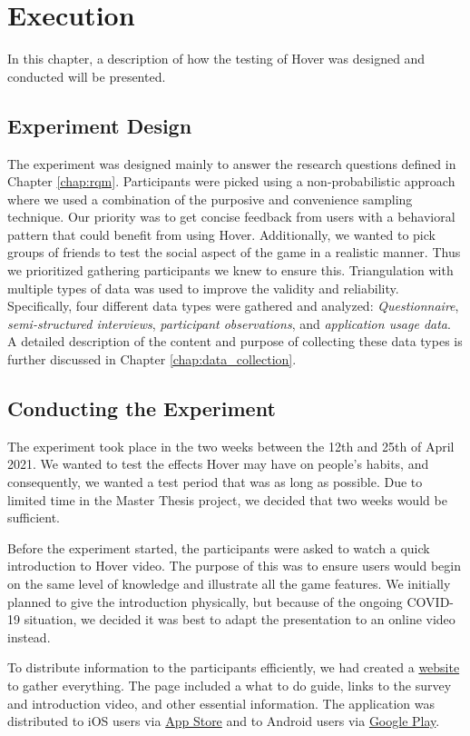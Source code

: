 \section{Execution}
\label{chap:execution}
In this chapter, a description of how the testing of Hover was designed and conducted will be presented.

\subsection{Experiment Design}
The experiment was designed mainly to answer the research questions defined in Chapter \ref{chap:rqm}. Participants were picked using a non-probabilistic approach where we used a combination of the purposive and convenience sampling technique. Our priority was to get concise feedback from users with a behavioral pattern that could benefit from using Hover. Additionally, we wanted to pick groups of friends to test the social aspect of the game in a realistic manner. Thus we prioritized gathering participants we knew to ensure this. Triangulation with multiple types of data was used to improve the validity and reliability. Specifically, four different data types were gathered and analyzed: \textit{Questionnaire}, \textit{semi-structured interviews}, \textit{participant observations}, and \textit{application usage data}. A detailed description of the content and purpose of collecting these data types is further discussed in Chapter \ref{chap:data_collection}.

\subsection{Conducting the Experiment}
The experiment took place in the two weeks between the 12th and 25th of April 2021. We wanted to test the effects Hover may have on people’s habits, and consequently, we wanted a test period that was as long as possible. Due to limited time in the Master Thesis project, we decided that two weeks would be sufficient. 

Before the experiment started, the participants were asked to watch a quick introduction to Hover video. The purpose of this was to ensure users would begin on the same level of knowledge and illustrate all the game features. We initially planned to give the introduction physically, but because of the ongoing COVID-19 situation, we decided it was best to adapt the presentation to an online video instead.

To distribute information to the participants efficiently, we had created a \href{https://hover-game.web.app/testing}{website} to gather everything. The page included a what to do guide, links to the survey and introduction video, and other essential information. The application was distributed to iOS users via \href{https://apps.apple.com/no/app/hover/id1556425356}{App Store} and to Android users via \href{https://play.google.com/store/apps/details?id=com.hoverapp.hover}{Google Play}.

